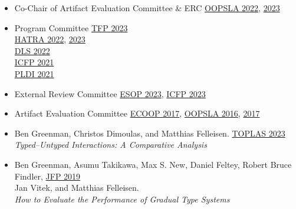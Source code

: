 \documentclass[11pt]{article}
\begin{document}
\begin{itemize}
  \item {Co-Chair of Artifact Evaluation Committee \& ERC} \hfill \href{https://2022.splashcon.org}{OOPSLA 2022}, \href{https://2023.splashcon.org}{2023}
  \item {Program Committee} \hfill \href{https://trendsfp.github.io/}{TFP 2023} \\
   \hbox{}\hfill \href{https://2022.splashcon.org/home/hatra-2022}{HATRA 2022}, \href{https://2023.splashcon.org/home/hatra-2023}{2023} \\
   \hbox{}\hfill \href{https://2022.splashcon.org/track/dls-2022-papers}{DLS 2022} \\
   \hbox{}\hfill \href{https://icfp21.sigplan.org/committee/icfp-2021-papers-program-committee}{ICFP 2021} \\
   \hbox{}\hfill \href{https://pldi21.sigplan.org/committee/pldi-2021-papers-program-committee}{PLDI 2021}
  \item {External Review Committee} \hfill \href{https://etaps.org/2023/esop}{ESOP 2023},
                                           \href{https://icfp23.sigplan.org/}{ICFP 2023}
  \item {Artifact Evaluation Committee} \hfill \href{https://2017.ecoop.org/track/ecoop-2017-Artifacts}{ECOOP 2017},
                                               \href{http://2016.splashcon.org/track/splash-2016-artifacts}{OOPSLA 2016},
                                               \href{https://2017.splashcon.org/track/splash-2017-OOPSLA-Artifacts}{2017}
\end{itemize}





\begin{itemize}
\item
  Ben Greenman, Christos Dimoulas, and Matthias Felleisen. \hfill \href{https://dl.acm.org/doi/10.1145/3579833}{TOPLAS 2023} \\
  \emph{Typed--Untyped Interactions: A Comparative Analysis}
\item
  Ben Greenman, Asumu Takikawa, Max S. New, Daniel Feltey, Robert Bruce Findler, \hfill \href{https://www.cambridge.org/core/journals/journal-of-functional-programming/article/abs/how-to-evaluate-the-performance-of-gradual-type-systems/DC765724C52A3A462F16C7FB3AD18697}{JFP 2019} \\
  Jan Vitek, and Matthias Felleisen. \\
  \emph{How to Evaluate the Performance of Gradual Type Systems}
\end{itemize}
\end{document}
